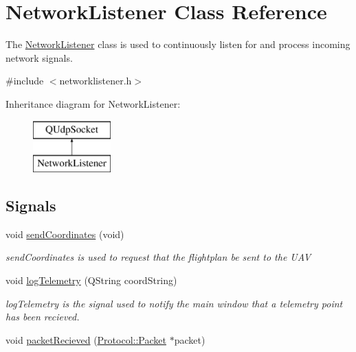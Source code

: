 \hypertarget{class_network_listener}{}\section{Network\+Listener Class Reference}
\label{class_network_listener}


The \hyperlink{class_network_listener}{Network\+Listener} class is used to continuously listen for and process incoming network signals.  




{\ttfamily \#include $<$networklistener.\+h$>$}

Inheritance diagram for Network\+Listener\+:\begin{figure}[H]
\begin{center}
\leavevmode
\includegraphics[height=2.000000cm]{class_network_listener}
\end{center}
\end{figure}
\subsection*{Signals}
\begin{DoxyCompactItemize}
\item 
void \hyperlink{class_network_listener_ac280873f9f90c046460b908fdb4a7883}{send\+Coordinates} (void)
\begin{DoxyCompactList}\small\item\em send\+Coordinates is used to request that the flightplan be sent to the U\+A\+V \end{DoxyCompactList}\item 
void \hyperlink{class_network_listener_a233d51dcc4d8945021d1b4043515e098}{log\+Telemetry} (Q\+String coord\+String)
\begin{DoxyCompactList}\small\item\em log\+Telemetry is the signal used to notify the main window that a telemetry point has been recieved. \end{DoxyCompactList}\item 
void \hyperlink{class_network_listener_aa695d0b565bb61dea1d03715b9f22e4b}{packet\+Recieved} (\hyperlink{class_protocol_1_1_packet}{Protocol\+::\+Packet} $\ast$packet)
\end{DoxyCompactItemize}

